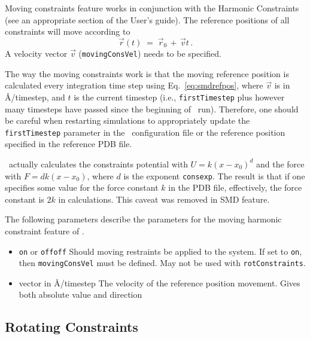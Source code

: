 Moving constraints feature works in conjunction with the Harmonic
Constraints (see an appropriate section of the User's guide).
The reference positions of all constraints
will move according to
\begin{equation}
\label{eq:smdrefpos}
   \vec r(t) \; = \; \vec r_0 \, + \, \vec v t \,.
\end{equation}
A velocity vector $\vec v$ ({\tt movingConsVel}) needs to be specified.

The way the moving constraints work is that the moving reference
position is calculated every integration time step using
Eq.~\ref{eq:smdrefpos}, where $\vec v$ is in \AA/timestep, and $t$ is the
current timestep (i.e., {\tt firstTimestep} plus however many
timesteps have passed since the beginning of \NAMD\ run). Therefore,
one should be careful when restarting simulations to appropriately
update the {\tt firstTimestep} parameter in the \NAMD\ configuration
file or the reference position specified in the reference PDB file.

 \NAMD\ actually calculates the constraints
potential with $U = k (x-x_0)^d$ and the force with $F = d k (x-x_0)$,
where $d$ is the exponent {\tt consexp}. The result is that if one
specifies some value for the force constant $k$ in the PDB file,
effectively, the force constant is $2 k$ in calculations. This caveat
was removed in SMD feature.

The following parameters describe the parameters for the
moving harmonic constraint feature of \NAMD.

\begin{itemize}

\item
{}
{{\tt on} or {\tt off}}{{\tt off}}
{Should moving restraints be applied to the system. If set
to {\tt on}, then  {\tt movingConsVel} must be defined.
May not be used with {\tt rotConstraints}.}

\item
{}
{vector in \AA/timestep}
{The velocity of the reference position movement. Gives both absolute
value and direction}

\end{itemize}

\subsection{Rotating Constraints}

